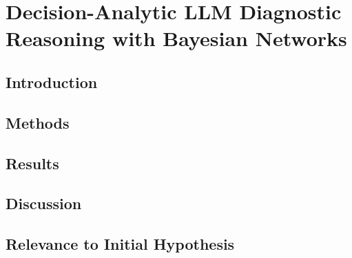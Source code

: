 \chapter{Decision-Analytic LLM Diagnostic Reasoning with Bayesian Networks} \label{chapter:bn-reasoning}

\section{Introduction}
\section{Methods}
\section{Results}
\section{Discussion}
\section{Relevance to Initial Hypothesis}
